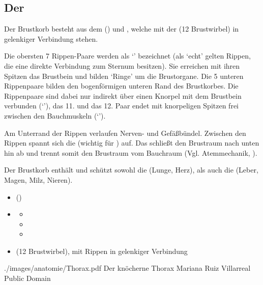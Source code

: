 \subsection{Der }
\label{topic:brustkorb-skelett}
\label{topic:thorax}



\TextSlidePicture
{\TxBeschreibung}%
{%
Der  Brustkorb besteht  aus dem 
 () und , welche  mit der
 (12 Brust\-wirbel) in gelenkiger
Verbindung stehen.

Die obersten 7 Rippen-Paare werden als 
\enquote*{} bezeichnet 
(als \enquote*{echt} gelten Rippen, 
die eine direkte Verbindung zum Sternum besitzen). 
%
Sie erreichen mit ihren Spitzen das Brustbein
und bilden \enquote*{Ringe} um die Brustorgane. 
%
Die 5 unteren Rippenpaare bilden den bogenförmigen unteren Rand des 
Brustkorbes. 
%
Die Rippenpaare  sind dabei nur indirekt über einen Knorpel
mit dem Brustbein verbunden (\enquote*{}), 
das 11. und das 12. Paar endet mit knorpeligen Spitzen frei zwischen den 
Bauchmuskeln 
(\enquote*{}).

 
Am Unterrand der Rippen verlaufen Nerven- und Gefäßbündel. 
%
Zwischen den
Rippen spannt sich die
(wichtig für ) auf.
%
Das 
 schließt den Brustraum nach unten hin ab
und trennt somit den Brustraum vom Bauchraum (Vgl.
Atemmechanik, ).

Der Brustkorb enthält und schützt sowohl 
die  (Lunge, Herz),
als auch die  (Leber, Magen, Milz, Nieren).
% 
}%
{
\begin{itemize}
    \item {} ()
    \item {}
    \begin{itemize}
        \item {}
        \item {}
        \item {}
    \end{itemize}
    \item {} (12 Brust\-wirbel), mit
    Rippen in gelenkiger Verbindung
\end{itemize}}%
{./images/anatomie/Thorax.pdf}%
{Der knöcherne Thorax}%
{}%
{Mariana Ruiz Villarreal}%
{Public Domain}%



